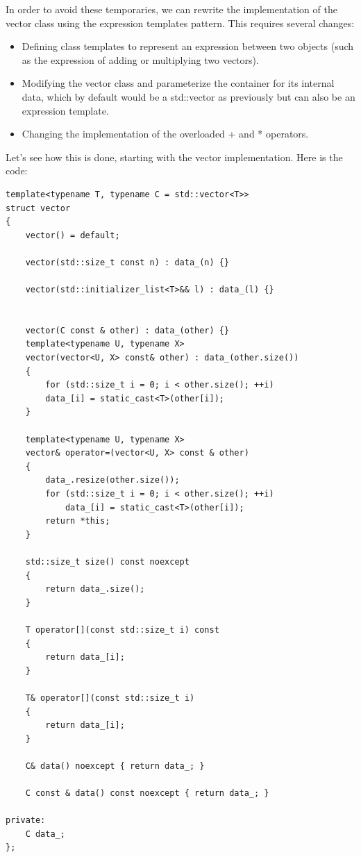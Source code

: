 In order to avoid these temporaries, we can rewrite the implementation of the vector class using the expression templates pattern. This requires several changes:

\begin{itemize}
\item
Defining class templates to represent an expression between two objects (such as the expression of adding or multiplying two vectors).

\item
Modifying the vector class and parameterize the container for its internal data, which by default would be a std::vector as previously but can also be an expression template.

\item
Changing the implementation of the overloaded + and * operators.
\end{itemize}

Let’s see how this is done, starting with the vector implementation. Here is the code:

\begin{lstlisting}[style=styleCXX]
template<typename T, typename C = std::vector<T>>
struct vector
{
	vector() = default;
	
	vector(std::size_t const n) : data_(n) {}
	
	vector(std::initializer_list<T>&& l) : data_(l) {}
	
	
	vector(C const & other) : data_(other) {}
	template<typename U, typename X>
	vector(vector<U, X> const& other) : data_(other.size())
	{
		for (std::size_t i = 0; i < other.size(); ++i)
		data_[i] = static_cast<T>(other[i]);
	}

	template<typename U, typename X>
	vector& operator=(vector<U, X> const & other)
	{
		data_.resize(other.size());
		for (std::size_t i = 0; i < other.size(); ++i)
			data_[i] = static_cast<T>(other[i]);
		return *this;
	}

	std::size_t size() const noexcept
	{
		return data_.size();
	}
	
	T operator[](const std::size_t i) const
	{
		return data_[i];
	}

	T& operator[](const std::size_t i)
	{
		return data_[i];
	}

	C& data() noexcept { return data_; }
	
	C const & data() const noexcept { return data_; }
	
private:
	C data_;
};
\end{lstlisting}

